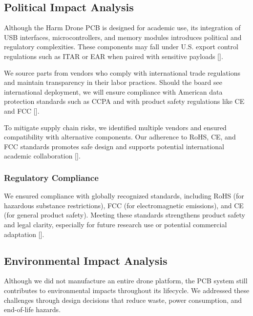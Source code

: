 \documentclass[12pt]{article}
\begin{document}
\subsection{Political Impact Analysis}

\par Although the Harm Drone PCB is designed for academic use, its integration of USB interfaces, microcontrollers, and memory modules introduces political and regulatory complexities. These components may fall under U.S. export control regulations such as ITAR or EAR when paired with sensitive payloads [].

\par We source parts from vendors who comply with international trade regulations and maintain transparency in their labor practices. Should the board see international deployment, we will ensure compliance with American data protection standards such as CCPA and with product safety regulations like CE and FCC [].

\par To mitigate supply chain risks, we identified multiple vendors and ensured compatibility with alternative components. Our adherence to RoHS, CE, and FCC standards promotes safe design and supports potential international academic collaboration [].

\subsubsection{Regulatory Compliance}

\par We ensured compliance with globally recognized standards, including RoHS (for hazardous substance restrictions), FCC (for electromagnetic emissions), and CE (for general product safety). Meeting these standards strengthens product safety and legal clarity, especially for future research use or potential commercial adaptation [].

\subsection{Environmental Impact Analysis}

\par Although we did not manufacture an entire drone platform, the PCB system still contributes to environmental impacts throughout its lifecycle. We addressed these challenges through design decisions that reduce waste, power consumption, and end-of-life hazards.
\end{document}
